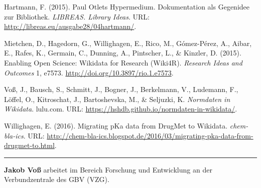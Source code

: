 \documentclass[a4paper,
fontsize=11pt,
oneside,
numbers=noperiodatend,
parskip=half-,
bibliography=totoc,
final
]{scrartcl}
\begin{document}
\hypertarget{refs}{}
\hypertarget{ref-Hartmann2015}{}
Hartmann, F. (2015). Paul Otlets Hypermedium. Dokumentation als
Gegenidee zur Bibliothek. \emph{LIBREAS. Library Ideas}. URL:
\url{http://libreas.eu/ausgabe28/04hartmann/}.

\hypertarget{ref-Wiki4R}{}
Mietchen, D., Hagedorn, G., Willighagen, E., Rico, M., Gómez-Pérez, A.,
Aibar, E., Rafes, K., Germain, C., Dunning, A., Pintscher, L., \&
Kinzler, D. (2015). Enabling Open Science: Wikidata for Research
(Wiki4R). \emph{Research Ideas and Outcomes} 1, e7573.
\url{http://doi.org/10.3897/rio.1.e7573}.

\hypertarget{ref-Voss2014}{}
Voß, J., Bausch, S., Schmitt, J., Bogner, J., Berkelmann, V., Ludemann,
F., Löffel, O., Kitroschat, J., Bartoshevska, M., \& Seljuzki, K.
\emph{Normdaten in Wikidata}. lulu.com. URL:
\url{https://hshdb.github.io/normdaten-in-wikidata/}.

\hypertarget{ref-Willighagen2016}{}
Willighagen, E. (2016). Migrating pKa data from DrugMet to Wikidata.
\emph{chem-bla-ics}. URL:
\url{http://chem-bla-ics.blogspot.de/2016/03/migrating-pka-data-from-drugmet-to.html}.

\begin{center}\rule{0.5\linewidth}{\linethickness}\end{center}

\textbf{Jakob Voß} arbeitet im Bereich Forschung und Entwicklung an der
Verbundzentrale des GBV (VZG).
\end{document}
